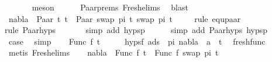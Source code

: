 \begin{isabellebody}
\ \ \ \ \ \isamarkupfalse%
\ meson\isanewline
\ \ \ \ \isamarkupfalse%
\ Paar{\isachardot}{\kern0pt}prems\ Fresh{\isacharunderscore}{\kern0pt}elims{\isacharparenleft}{\kern0pt}{}{\isacharparenright}{\kern0pt}\ \isamarkupfalse%
\ blast\isanewline
\ \ \isamarkupfalse%
\ {\isachardoublequoteopen}nabla\ {\isasymturnstile}\ Paar\ t{}\ t{}\ {\isasymapprox}\ Paar\ {\isacharparenleft}{\kern0pt}swap\ pi\ t{}{\isacharparenright}{\kern0pt}\ {\isacharparenleft}{\kern0pt}swap\ pi\ t{}{\isacharparenright}{\kern0pt}{\isachardoublequoteclose}\isanewline
\ \ \ \ \isamarkupfalse%
{\isacharparenleft}{\kern0pt}rule\ equ{\isacharunderscore}{\kern0pt}paar{\isacharparenright}{\kern0pt}\isanewline
\ \ \ \ \ \isamarkupfalse%
{\isacharparenleft}{\kern0pt}rule\ Paar{\isachardot}{\kern0pt}hyps{\isacharparenright}{\kern0pt}\isanewline
\ \ \ \ \ \isamarkupfalse%
\ {\isacharparenleft}{\kern0pt}simp\ add{\isacharcolon}{\kern0pt}\ hypsp{}{\isacharparenright}{\kern0pt}\isanewline
\ \ \ \ \isamarkupfalse%
\ {\isacharparenleft}{\kern0pt}simp\ add{\isacharcolon}{\kern0pt}\ Paar{\isachardot}{\kern0pt}hyps{\isacharparenleft}{\kern0pt}{}{\isacharparenright}{\kern0pt}\ hypsp{}{\isacharparenright}{\kern0pt}\isanewline
\ \ \isamarkupfalse%
\ \isamarkupfalse%
\ {\isacharquery}{\kern0pt}case\ \isamarkupfalse%
\ simp\isanewline
{}\isamarkupfalse%
\isanewline
\ \ \isamarkupfalse%
\ {\isacharparenleft}{\kern0pt}Func\ f\ t{\isacharprime}{\kern0pt}{\isacharparenright}{\kern0pt}\isanewline
\ \ \isamarkupfalse%
\ \isamarkupfalse%
\ hypsf{\isacharcolon}{\kern0pt}\ {\isachardoublequoteopen}{\isasymforall}a{\isasymin}ds\ {\isacharbrackleft}{\kern0pt}{\isacharbrackright}{\kern0pt}\ pi{\isachardot}{\kern0pt}\ nabla\ {\isasymturnstile}\ a\ {\isasymsharp}\ t{\isacharprime}{\kern0pt}{\isachardoublequoteclose}\ \isamarkupfalse%
\ fresh{\isacharunderscore}{\kern0pt}func\isanewline
\ \ \ \ \isamarkupfalse%
\ {\isacharparenleft}{\kern0pt}metis\ Fresh{\isacharunderscore}{\kern0pt}elims{\isacharparenleft}{\kern0pt}{}{\isacharparenright}{\kern0pt}{\isacharparenright}{\kern0pt}\isanewline
\ \ \isamarkupfalse%
\ {\isachardoublequoteopen}nabla\ {\isasymturnstile}\ Func\ f\ t{\isacharprime}{\kern0pt}\ {\isasymapprox}\ Func\ f\ {\isacharparenleft}{\kern0pt}swap\ pi\ t{\isacharprime}{\kern0pt}{\isacharparenright}{\kern0pt}{\isachardoublequoteclose}\isanewline

\end{isabellebody}
